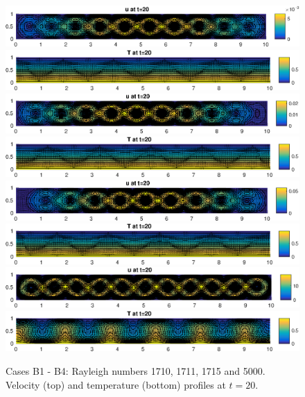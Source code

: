 \documentclass[10pt,a4paper]{article}
\begin{document}
\begin{figure}[H]
  \centering
  \includegraphics[width=\linewidth]{Part2_Case_B1_Velocity.eps}
  \includegraphics[width=\linewidth]{Part2_Case_B1_Temp.eps}
    \includegraphics[width=\linewidth]{Part2_Case_B2_Velocity.eps}
  \includegraphics[width=\linewidth]{Part2_Case_B2_Temp.eps}
    \includegraphics[width=\linewidth]{Part2_Case_B3_Velocity.eps}
  \includegraphics[width=\linewidth]{Part2_Case_B3_Temp.eps}
    \includegraphics[width=\linewidth]{Part2_Case_B4_Velocity.eps}
  \includegraphics[width=\linewidth]{Part2_Case_B4_Temp.eps}
\caption{Cases B1 - B4: Rayleigh numbers 1710, 1711, 1715 and 5000. Velocity (top) and temperature (bottom) profiles at $t = 20$.}
\label{fig:case2B}
\end{figure}
\end{document}
